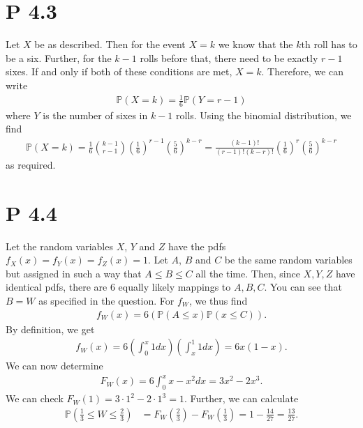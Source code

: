 \documentclass{article}
\renewcommand{\P}{\mathbb{P}}
\begin{document}
\section*{P 4.3}
Let $X$ be as described. Then for the event $X=k$ we know that
the $k$th roll has to be a six. Further, for the $k-1$ rolls before
that, there need to be exactly $r-1$ sixes. If and only if both of these
conditions are met, $X=k$. Therefore, we can write
\begin{align*}
  \P(X=k) = \frac{1}{6}\P(Y=r-1)
\end{align*}
where $Y$ is the number of sixes in $k-1$ rolls. Using the binomial
distribution, we find
\begin{align*}
  \P(X=k) = \frac{1}{6}\binom{k-1}{r-1}\left(\frac{1}{6}\right)^ {r-1}
  \left(\frac{5}{6}\right)^{k-r}
  = \frac{(k-1)!}{(r-1)!(k-r)!}\left(\frac{1}{6}\right)^r\left(\frac{5}{6}\right)^{k-r}
\end{align*}
as required.
\section*{P 4.4}
Let the random variables $X$, $Y$ and $Z$ have 
the pdfs $f_X(x)=f_Y(x)=f_Z(x)=1$. Let $A$, $B$ and $C$
be the same random variables but assigned in such a way that
$A\leq B\leq C$ all the time. Then, since $X,Y,Z$ have identical pdfs,
there are $6$ equally likely mappings to $A,B,C$.
You can see that $B=W$ as specified in the question. For $f_W$, 
we thus find
\begin{align*}
  f_W(x) = 6\left(\P(A \leq x)\P(x \leq C)\right).
\end{align*}
By definition, we get
\begin{align*}
  f_W(x) = 6\left(\int_0^x 1dx\right)\left(\int_x^1 1dx\right) = 6x(1-x).
\end{align*}
We can now determine
\begin{align*}
  F_W(x) = 6\int_0^x x - x^2 dx = 3x^2-2x^3.
\end{align*}
We can check $F_W(1) = 3\cdot 1^2 - 2 \cdot 1^3 = 1$. Further, we can
calculate
\begin{align*}
  \P\left(\frac{1}{3}\leq W \leq \frac{2}{3}\right)
  &= F_W\left(\frac{2}{3}\right) - F_W\left(\frac{1}{3}\right)
  = 1 - \frac{14}{27} = \frac{13}{27}.
\end{align*}
\end{document}
